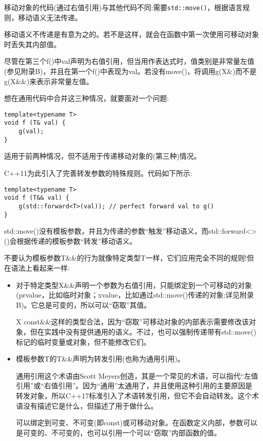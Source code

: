 移动对象的代码(通过右值引用)与其他代码不同:需要\texttt{std::move()}，根据语言规则，移动语义无法传递。

\begin{tcolorbox}[colback=webgreen!5!white,colframe=webgreen!75!black]
\hspace*{0.75cm}移动语义不传递是有意为之的。若不是这样，就会在函数中第一次使用可移动对象时丢失其内部值。
\end{tcolorbox}

尽管在第三个f()中val声明为右值引用，但当用作表达式时，值类别是非常量左值(参见附录B)，并且在第一个f()中表现为val。若没有move()，将调用g(X\&)而不是g(X\&\&)来表示非常量左值。

想在通用代码中合并这三种情况，就要面对一个问题:

\begin{lstlisting}[style=styleCXX]
template<typename T>
void f (T& val) {
	g(val);
}
\end{lstlisting}

适用于前两种情况，但不适用于传递移动对象的(第三种)情况。

C++11为此引入了完善转发参数的特殊规则。代码如下所示:

\begin{lstlisting}[style=styleCXX]
template<typename T>
void f (T&& val) {
	g(std::forward<T>(val)); // perfect forward val to g()
}
\end{lstlisting}

std::move()没有模板参数，并且为传递的参数“触发”移动语义，而std::forward<>()会根据传递的模板参数“转发”移动语义。

不要认为模板参数T\&\&的行为就像特定类型T一样，它们应用完全不同的规则!但在语法上看起来一样:

\begin{itemize}
\item 
对于特定类型X\&\&声明一个参数为右值引用，只能绑定到一个可移动的对象(prvalue，比如临时对象；xvalue，比如通过std::move()传递的对象;详见附录B)。它总是可变的，所以可以“窃取”其值。

\begin{tcolorbox}[colback=webgreen!5!white,colframe=webgreen!75!black]
\hspace*{0.75cm}X const\&\&这样的类型合法，因为“窃取”可移动对象的内部表示需要修改该对象，但在实践中没有提供通用的语义。不过，也可以强制传递带有std::move()标记的临时变量或对象，但不能修改它们。
\end{tcolorbox}

\item 
模板参数T的T\&\&声明为转发引用(也称为通用引用)。

\begin{tcolorbox}[colback=webgreen!5!white,colframe=webgreen!75!black]
\hspace*{0.75cm}通用引用这个术语由Scott Meyers创造，其是一个常见的术语，可以指代“左值引用”或“右值引用”。因为“通用”太通用了，并且使用这种引用的主要原因是转发对象，所以C++17标准引入了术语转发引用，但它不会自动转发。这个术语没有描述它是什么，但描述了用于做什么。
\end{tcolorbox}

可以绑定到可变、不可变(即const)或可移动对象。在函数定义内部，参数可以是可变的、不可变的，也可以引用一个可以“窃取”内部函数的值。
\end{itemize}

